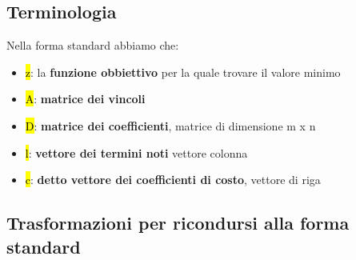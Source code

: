 \subsection{Terminologia}

Nella forma standard abbiamo che:

\begin{itemize}
	\item \hl{z}: la \textbf{funzione obbiettivo} per la quale trovare il valore minimo
	\item \hl{A}: \textbf{matrice dei vincoli}
	\item \hl{D}: \textbf{matrice dei coefficienti}, matrice di dimensione m x n
	\item \hl{l}: \textbf{vettore dei termini noti} vettore colonna 
	\item \hl{c}: \textbf{detto vettore dei coefficienti di costo}, vettore di riga
\end{itemize}


\subsection{Trasformazioni per ricondursi alla forma standard}

